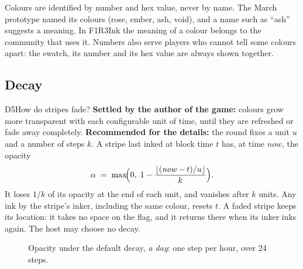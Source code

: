 \documentclass[11pt,a4paper]{article}
\begin{document}
Colours are identified by number and hex value, never by name. The March prototype named its
colours (rose, ember, ash, void), and a name such as ``ash'' suggests a meaning. In F1R3Ink the
meaning of a colour belongs to the community that uses it. Numbers also serve players who cannot
tell some colours apart: the swatch, its number and its hex value are always shown together.

\subsection{Decay}

\begin{decision}{D5}{How do stripes fade?}
\textbf{Settled by the author of the game:} colours grow more transparent with each configurable
unit of time, until they are refreshed or fade away completely. \textbf{Recommended for the
details:} the round fixes a unit $u$ and a number of steps $k$. A stripe last inked at block time
$t$ has, at time $\mathit{now}$, the opacity
\[
  \alpha \;=\; \max\!\Bigl(0,\; 1 - \frac{\lfloor(\mathit{now}-t)/u\rfloor}{k}\Bigr).
\]
It loses $1/k$ of its opacity at the end of each unit, and vanishes after $k$ units. Any ink by
the stripe's inker, including the same colour, resets $t$. A faded stripe keeps its location: it
takes no space on the flag, and it returns there when its inker inks again. The host may choose
no decay.
\end{decision}

\begin{figure}[h]
\centering
{}
\caption{Opacity under the default decay, \emph{a day}: one step per hour, over 24 steps.}
\label{fig:decay}
\end{figure}
\end{document}
